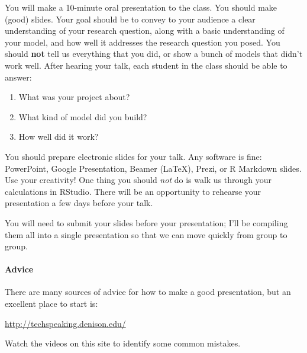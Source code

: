 \documentclass[10pt]{article}
\begin{document}
	You will make a 10-minute oral presentation to the class. You should make (good) slides. Your goal should be to convey to your audience a clear understanding of your research question, along with a basic understanding of your model, and how well it addresses the research question you posed. You should \textbf{not} tell us everything that you did, or show a bunch of models that didn't work well. After hearing your talk, each student in the class should be able to answer: 
	\begin{enumerate}
		\item What was your project about? 
		\item What kind of model did you build? 
		\item How well did it work?  
	\end{enumerate}

You should prepare electronic slides for your talk. Any software is fine: PowerPoint, Google Presentation, Beamer (\LaTeX), Prezi, or R Markdown slides. Use your creativity! One thing you should \emph{not} do is walk us through your calculations in RStudio. 
There will be an opportunity to rehearse your presentation a few days before your talk.

You will need to submit your slides before your presentation; I'll be compiling them all into a single presentation so that we can move quickly from group to group.

\paragraph{Advice}

There are many sources of advice for how to make a good presentation, but an excellent place to start is:
\begin{center}
	\url{http://techspeaking.denison.edu/}
\end{center}
Watch the videos on this site to identify some common mistakes. 
\end{document}
